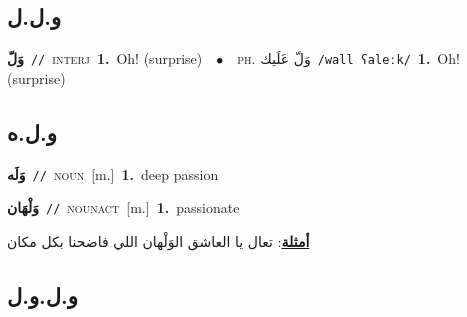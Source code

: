 \documentclass[10pt,a4paper,twoside]{article} %
\begin{document}
\begin{multicols}{2}
\vspace{-3mm}
\subsection*{\color{blue}\foreignlanguage{arabic}{و.ل.ل}\color{blue}{}} 

{\setlength\topsep{0pt}\textbf{\foreignlanguage{arabic}{وَلّ}}\ {\color{gray}\texttt{//}\color{black}}\ \textsc{interj}\ \textbf{1.}~Oh! (surprise)\ \ $\bullet$\ \ \textsc{ph.} \color{gray} \foreignlanguage{arabic}{وَلّ عَلَيك}\color{black}\ {\color{gray}\texttt{/{\sffamily wall ʕaleːk}/}\color{black}}\ \textbf{1.}~Oh! (surprise)\ } \vspace{2mm}

\vspace{-3mm}
\subsection*{\color{blue}\foreignlanguage{arabic}{و.ل.ه}\color{blue}{}} 

{\setlength\topsep{0pt}\textbf{\foreignlanguage{arabic}{وَلَه}}\ {\color{gray}\texttt{//}\color{black}}\ \textsc{noun}\ [m.]\ \textbf{1.}~deep passion\ } \vspace{2mm}

{\setlength\topsep{0pt}\textbf{\foreignlanguage{arabic}{وَلْهَان}}\ {\color{gray}\texttt{//}\color{black}}\ \textsc{noun\textunderscore act}\ [m.]\ \textbf{1.}~passionate\  \begin{flushright}\color{gray}\foreignlanguage{arabic}{\textbf{\underline{\foreignlanguage{arabic}{أمثلة}}}: تعال يا العاشق الوَلْهان اللي فاضحنا بكل مكان}\end{flushright}\color{black}} \vspace{2mm}

\vspace{-3mm}
\subsection*{\color{blue}\foreignlanguage{arabic}{و.ل.و.ل}\color{blue}{}} 


\end{multicols}
\end{document}
